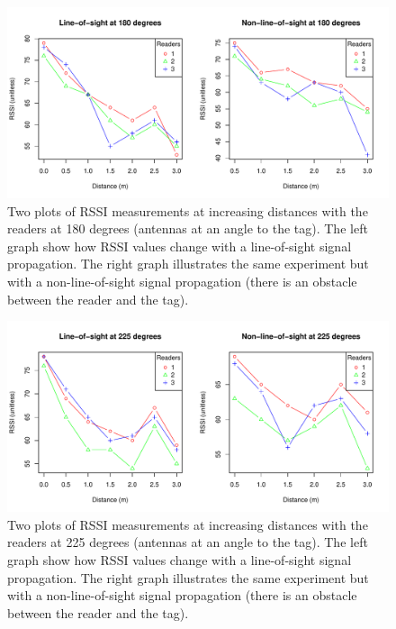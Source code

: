 \begin{figure}[H]
	\begin{center}
		\includegraphics[width=1\textwidth]{figures/rssi_distance_3m_180deg}
		\caption{Two plots of RSSI measurements at increasing distances with the readers at 180 degrees (antennas at an angle to the tag). The left graph show how RSSI values change with a line-of-sight signal propagation. The right graph illustrates the same experiment but with a non-line-of-sight signal propagation (there is an obstacle between the reader and the tag).}
	\end{center}
\end{figure}

\begin{figure}[H]
	\begin{center}
		\includegraphics[width=1\textwidth]{figures/rssi_distance_3m_225deg}
		\caption{Two plots of RSSI measurements at increasing distances with the readers at 225 degrees (antennas at an angle to the tag). The left graph show how RSSI values change with a line-of-sight signal propagation. The right graph illustrates the same experiment but with a non-line-of-sight signal propagation (there is an obstacle between the reader and the tag).}
	\end{center}
\end{figure}

